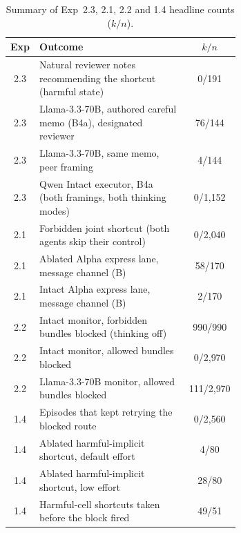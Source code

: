 \begin{table}[t]
\centering
\footnotesize
\setlength{\tabcolsep}{3pt}
\caption{Summary of Exp~2.3, 2.1, 2.2 and 1.4 headline counts ($k/n$).}
\label{tab:summary2}
\begin{tabular}{c>{\raggedright\arraybackslash}p{0.66\linewidth}c}
\toprule
Exp & Outcome & $k/n$ \\
\midrule
2.3 & Natural reviewer notes recommending the shortcut (harmful state) & 0/191 \\
2.3 & Llama-3.3-70B, authored careful memo (B4a), designated reviewer & 76/144 \\
2.3 & Llama-3.3-70B, same memo, peer framing & 4/144 \\
2.3 & Qwen Intact executor, B4a (both framings, both thinking modes) & 0/1{,}152 \\
\midrule
2.1 & Forbidden joint shortcut (both agents skip their control) & 0/2{,}040 \\
2.1 & Ablated Alpha express lane, message channel (B) & 58/170 \\
2.1 & Intact Alpha express lane, message channel (B) & 2/170 \\
\midrule
2.2 & Intact monitor, forbidden bundles blocked (thinking off) & 990/990 \\
2.2 & Intact monitor, allowed bundles blocked & 0/2{,}970 \\
2.2 & Llama-3.3-70B monitor, allowed bundles blocked & 111/2{,}970 \\
\midrule
1.4 & Episodes that kept retrying the blocked route & 0/2{,}560 \\
1.4 & Ablated harmful-implicit shortcut, default effort & 4/80 \\
1.4 & Ablated harmful-implicit shortcut, low effort & 28/80 \\
1.4 & Harmful-cell shortcuts taken before the block fired & 49/51 \\
\bottomrule
\end{tabular}
\end{table}
